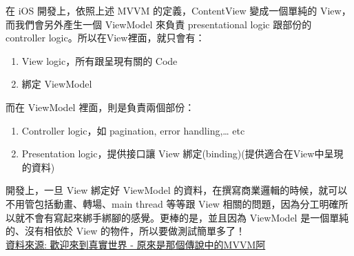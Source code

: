 \documentclass[a4paper,12pt]{article}
\begin{document}
在 iOS 開發上，依照上述 MVVM 的定義，ContentView 變成一個單純的 View，而我們會另外產生一個 ViewModel 來負責 presentational logic 跟部份的 controller logic。所以在View裡面，就只會有：\\
\begin{enumerate}
\item View logic，所有跟呈現有關的 Code\\
\item 綁定 ViewModel\\
\end{enumerate}
而在 ViewModel 裡面，則是負責兩個部份：\\
\begin{enumerate}
\item Controller logic，如 pagination, error handling,… etc\\
\item Presentation logic，提供接口讓 View 綁定(binding)(提供適合在View中呈現的資料)\\
\end{enumerate}
開發上，一旦 View 綁定好 ViewModel 的資料，在撰寫商業邏輯的時候，就可以不用管包括動畫、轉場、main thread 等等跟 View 相關的問題，因為分工明確所以就不會有寫起來綁手綁腳的感覺。更棒的是，並且因為 ViewModel 是一個單純的、沒有相依於 View 的物件，所以要做測試簡單多了！\\
\href{https://www.codementor.io/@koromiko/mvvm-app-cl1wvw2sh}{資料來源: 歡迎來到真實世界 - 原來是那個傳說中的MVVM阿}\\
\end{document}
